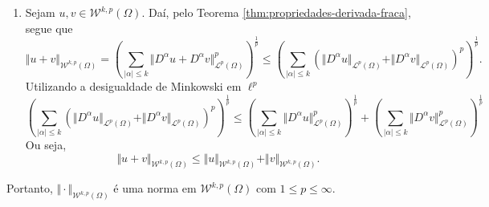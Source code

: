\documentclass[a4paper, 11pt]{book}
\theoremstyle{definition}
\newcommand{\cL}{\mathcal{L}}
\newcommand{\cW}{\mathcal{W}}
\begin{document}
\begin{prf}
\begin{enumerate}[leftmargin=*]
        \item Sejam $u, v \in \cW^{k,p}(\Omega)$. Daí, pelo Teorema \ref{thm:propriedades-derivada-fraca}, segue que
        \[
            \Vert u + v \Vert_{\cW^{k,p}(\Omega)} = \left(\sum_{|\alpha| \leqslant k} \Vert D^\alpha u + D^\alpha v \Vert_{\cL^p(\Omega)}^p\right)^{\!\!\frac{1}{p}} \leqslant \left(\sum_{|\alpha| \leqslant k} \left(\Vert D^\alpha u \Vert_{\cL^p(\Omega)} + \Vert D^\alpha v \Vert_{\cL^p(\Omega)}\right)^p \right)^{\!\!\frac{1}{p}}.
        \]
        Utilizando a desigualdade de Minkowski em $\ell^p$
        \[
            \left(\sum_{|\alpha| \leqslant k} \left(\Vert D^\alpha u \Vert_{\cL^p(\Omega)} + \Vert D^\alpha v \Vert_{\cL^p(\Omega)}\right)^p \right)^{\!\!\frac{1}{p}} \leqslant \left( \sum_{|\alpha| \leqslant k} \Vert D^\alpha u \Vert_{\cL^p(\Omega)}^p \right)^{\!\!\frac{1}{p}} + \left( \sum_{|\alpha| \leqslant k} \Vert D^\alpha v \Vert_{\cL^p(\Omega)}^p \right)^{\!\!\frac{1}{p}}
        \]
        Ou seja,
        \[
            \Vert u + v \Vert_{\cW^{k,p}(\Omega)} \leqslant \Vert u \Vert_{\cW^{k,p}(\Omega)} + \Vert v \Vert_{\cW^{k,p}(\Omega)}.
        \]
    \end{enumerate}
    Portanto, $\Vert \cdot \Vert_{\cW^{k,p}(\Omega)}$ é uma norma em $\cW^{k,p}(\Omega)$ com $1 \leqslant p \leqslant \infty$.
\end{prf}
\end{document}
